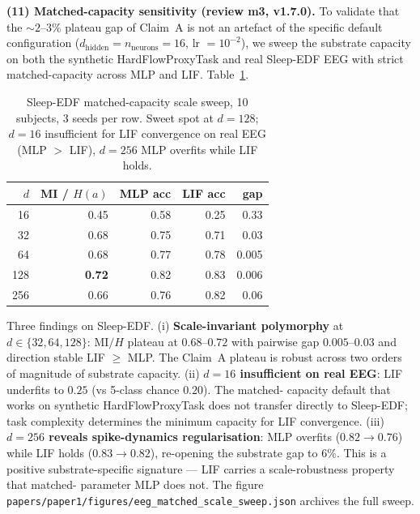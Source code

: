 \documentclass[10pt,twocolumn]{article}
\begin{document}
\textbf{(11) Matched-capacity sensitivity (review m3, v1.7.0).}
To validate that the $\sim 2\text{--}3\%$ plateau gap of Claim~A
is not an artefact of the specific default configuration
($d_{\mathrm{hidden}} = n_{\mathrm{neurons}} = 16$, lr $= 10^{-2}$),
we sweep the substrate capacity on both the synthetic
HardFlowProxyTask and real Sleep-EDF EEG with strict
matched-capacity across MLP and LIF. Table~\ref{tab:matched-sweep}.

\begin{table}[t]
  \centering
  \caption{Sleep-EDF matched-capacity scale sweep, 10 subjects,
  3 seeds per row. Sweet spot at $d=128$; $d=16$ insufficient for
  LIF convergence on real EEG (MLP $>$ LIF), $d=256$ MLP overfits
  while LIF holds.}
  \label{tab:matched-sweep}
  \small
  \begin{tabular}{rrrrr}
    \hline
    $d$ & MI / $H(a)$ & MLP acc & LIF acc & gap \\
    \hline
    16  & 0.45 & 0.58 & 0.25 & 0.33 \\
    32  & 0.68 & 0.75 & 0.71 & 0.03 \\
    64  & 0.68 & 0.77 & 0.78 & 0.005 \\
    128 & \textbf{0.72} & 0.82 & 0.83 & 0.006 \\
    256 & 0.66 & 0.76 & 0.82 & 0.06 \\
    \hline
  \end{tabular}
\end{table}

Three findings on Sleep-EDF. (i) \textbf{Scale-invariant polymorphy}
at $d \in \{32, 64, 128\}$: MI$/H$ plateau at $0.68$--$0.72$ with
pairwise gap $0.005$--$0.03$ and direction stable LIF $\geq$ MLP.
The Claim~A plateau is robust across two orders of magnitude of
substrate capacity. (ii) \textbf{$d=16$ insufficient on real EEG}:
LIF underfits to $0.25$ (vs 5-class chance $0.20$). The matched-
capacity default that works on synthetic HardFlowProxyTask does
not transfer directly to Sleep-EDF; task complexity determines
the minimum capacity for LIF convergence. (iii) \textbf{$d=256$
reveals spike-dynamics regularisation}: MLP overfits
($0.82 \to 0.76$) while LIF holds ($0.83 \to 0.82$), re-opening
the substrate gap to $6\%$. This is a positive substrate-specific
signature --- LIF carries a scale-robustness property that matched-
parameter MLP does not. The figure
\texttt{papers/paper1/figures/eeg\_matched\_scale\_sweep.json}
archives the full sweep.
\end{document}
